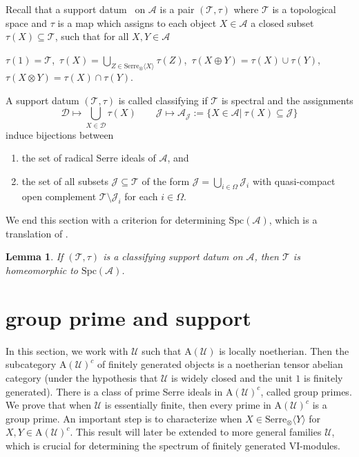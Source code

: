 \documentclass[11pt,a4paper]{amsart}
\numberwithin{equation}{section} \theoremstyle{plain}
\newtheorem{lem}{Lemma}[section]
\begin{document}
Recall that a support datum~\cite[Definition 7.9 ]{BKS} on $\mathcal{A}$ is a pair $(\mathcal{T}, \tau)$ where $\mathcal{T}$ is a topological space and $\tau$ is a map which assigns to each object $X\in \mathcal{A}$ a closed subset $\tau(X)\subseteq \mathcal{T}$, such that for all $X,Y\in \mathcal{A}$

$\tau(\mathrm{1})=\mathcal{T}$,~$\tau(X)=\bigcup_{Z\in \mathrm{Serre}_{\otimes}\langle X\rangle}\tau(Z)$,~$\tau(X\oplus Y)=\tau(X)\cup \tau(Y)$,~$\tau(X\otimes Y)=\tau(X)\cap \tau(Y)$.

A support datum $(\mathcal{T}, \tau)$ is called classifying if $\mathcal{T}$ is spectral and the assignments
$$ \mathcal{D}\mapsto \bigcup_{X\in \mathcal{D}}\tau(X) \quad\quad \mathcal{J}\mapsto \mathcal{A}_{\mathcal{J}}:=\{X\in \mathcal{A}|~\tau(X)\subseteq \mathcal{J}\}$$
induce bijections between
\begin{enumerate}
\item the set of radical Serre ideals of $\mathcal{A}$, and

\item the set of all subsets $\mathcal{J}\subseteq \mathcal{T}$ of the form $\mathcal{J}=\bigcup_{i\in \Omega}\mathcal{J}_{i}$ with quasi-compact open
complement $\mathcal{T}\setminus \mathcal{J}_{i}$ for each $i\in \Omega$.

\end{enumerate}

We end this section with a criterion for determining $\mathrm{Spc}(\mathcal{A})$, which is a translation of \cite[Corollary 6.2]{BKS}.
\begin{lem}\label{lem 3.8} If $(\mathcal{T}, \tau)$ is a classifying support datum on $\mathcal{A}$, then $\mathcal{T}$ is homeomorphic to $\mathrm{Spc}(\mathcal{A})$.
\end{lem}






 \section{\bf group prime and support}

In this section, we work with $\mathcal{U}$ such that $\mathrm{A}(\mathcal{U})$ is locally noetherian. Then the subcategory $\mathrm{A}(\mathcal{U})^{c}$ of finitely generated objects is a noetherian tensor abelian category (under the hypothesis that $\mathcal{U}$  is widely closed and the unit $\mathrm{1}$ is finitely generated). There is a class of prime Serre ideals in $\mathrm{A}(\mathcal{U})^{c}$, called group primes. We prove that when $\mathcal{U}$ is essentially finite, then every prime in $\mathrm{A}(\mathcal{U})^{c}$ is a group prime. An important step is to characterize when $X\in \mathrm{Serre}_{\otimes}\langle Y\rangle$ for $X,Y\in \mathrm{A}(\mathcal{U})^{c}$. This result will later be extended to more general families $\mathcal{U}$, which is crucial for determining the spectrum of finitely generated VI-modules.
\end{document}

